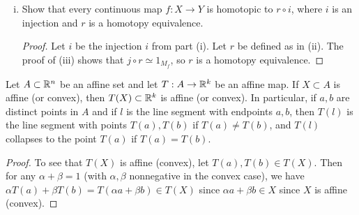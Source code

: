 \documentclass{article}
\begin{document}
\begin{enumerate}[(i)]
\begin{proof}
Let $F$ be defined as in the hint. To see that $F$ is a well-defined continous map, let 
$G: ((X \times I) \sqcup Y) \times I \to ((X \times I) \sqcup Y) \times I$ be defined by
$G(x,t,s) = (x, (1-s)t+ s)$ and $G(y,s) = y$ for $(x,t) \in X \times I$ and $y \in Y$.
Then $G$ is continuous, and $G(x,1,s) = (x,1)$ and $G(y,s) = y$ for all $x \in X$ and $y \in Y$. Thus,
$G$ respects the identification map defining $M_f$.  Hence $F$, the induced map, is a continuous map.

Moreover, $F([x,t], 0) = [x,t]$ and $F([y],0) = [y]$, so $F( \cdot, 0) = 1_{M_f}$. Lastly,
$F([x,t], 1) = [x, 1] \in Y$ and $F([y],1) = [y]$.  Thus, $Y$ is a deformation retract of $M_f$.
\end{proof}



\item Show that every continuous map $f: X \to Y$ is homotopic to $r \circ i$, where $i$ is
 an injection and $r$ is a homotopy equivalence.

\begin{proof}
Let $i$ be the injection $i$ from part (i). Let $r$ be defined as in (ii).  The proof
of (iii) shows that $j \circ r \simeq 1_{M_f}$, so $r$ is a homotopy equivalence.
\end{proof}


\end{enumerate}

 Let $A \subset \mathbb{R}^n$ be an affine set and let $T: A \to \mathbb{R}^k$ be an affine map. If
$X \subset A$ is affine (or convex), then $T(X) \subset \mathbb{R}^k$ is affine (or convex). In
particular, if $a,b$ are distinct points in $A$ and if $l$ is the line segment with endpoints
$a,b$, then $T(l)$ is the line segment with points $T(a), T(b)$ if $T(a) \neq T(b)$, and 
$T(l)$ collapses to the point $T(a)$ if $T(a) = T(b)$.

\begin{proof}
To see that $T(X)$ is affine (convex), let $T(a), T(b) \in T(X)$.  Then
for any $\alpha + \beta = 1$ (with $\alpha,\beta$ nonnegative in the convex case),
 we have $\alpha T(a) + \beta T(b) = T(\alpha a + \beta b) \in T(X)$ since 
$\alpha a + \beta b \in X$ since $X$ is affine (convex).  
\end{proof}
\end{document}
